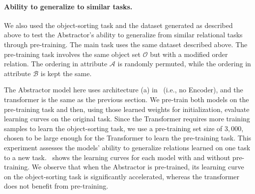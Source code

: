 \paragraph{Ability to generalize to similar tasks.}
We also used the object-sorting task and the dataset generated as described above to test the Abstractor's ability to generalize from similar relational tasks through pre-training. The main task uses the same dataset described above. The pre-training task involves the same object set $\mathcal{O}$ but with a modified order relation. The ordering in attribute $\mathcal{A}$ is randomly permuted, while the ordering in attribute $\mathcal{B}$ is kept the same. %

The Abstractor model here uses architecture (a) in~ (i.e., no Encoder), and the transformer is the same as the previous section. We pre-train both models on the pre-training task and then, using those learned weights for initialization, evaluate learning curves on the original task. Since the Transformer requires more training samples to learn the object-sorting task, we use a pre-training set size of $3,000$, chosen to be large enough for the Transformer to learn the pre-training task. This experiment assesses the models' ability to generalize relations learned on one task to a new task.~ shows the learning curves for each model with and without pre-training. We observe that when the Abstractor is pre-trained, its learning curve on the object-sorting task is significantly accelerated, whereas the transformer does not benefit from pre-training.
